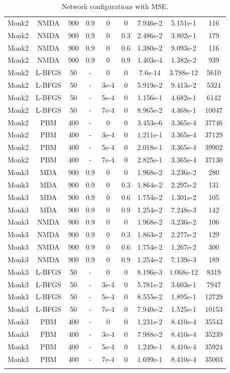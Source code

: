 \begin{center}
\begin{longtable}{|c|c|c|c|c|c|c|c|c|}
			Monk2 & NMDA & 900 & 0.9 & 0  & 0 & 7.946e-2 & 5.151e-1 & 116\\
			Monk2 & NMDA & 900 & 0.9 & 0  & 0.3 & 2.486e-2 & 3.802e-1 & 179\\
			Monk2 & NMDA & 900 & 0.9 & 0  & 0.6 & 1.380e-2 & 9.093e-2 & 116\\
			Monk2 & NMDA & 900 & 0.9 & 0  & 0.9 & 1.403e-4 & 1.382e-2 & 939\\
			Monk2 & L-BFGS & 50 & - & 0  & 0 & 7.6e-14 & 3.788e-12 & 5610\\
			Monk2 & L-BFGS & 50 & - & 3e-4  & 0  & 5.919e-2 & 9.413e-2 & 5324\\
			Monk2 & L-BFGS & 50 & - & 5e-4  & 0  & 1.156e-1& 4.682e-1 & 6142\\
			Monk2 & L-BFGS & 50 & - & 7e-4  & 0  & 8.965e-2 &  4.468e-1 & 10047\\
			Monk2 & PBM & 400 & - & 0  & 0 & 3.453e-6 & 3.365e-4 & 37746\\
			Monk2 & PBM & 400 & - & 3e-4  & 0 & 1.211e-1 & 3.365e-4 & 37129\\
			Monk2 & PBM & 400 & - & 5e-4  & 0 & 2.018e-1 & 3.365e-4 & 39902\\
			Monk2 & PBM & 400 & - & 7e-4  & 0 & 2.825e-1 & 3.365e-4 & 37130\\
			Monk3 & MDA & 900 & 0.9 & 0  & 0 & 1.968e-2 & 3.236e-2 & 280\\
			Monk3 & MDA & 900 & 0.9 & 0  & 0.3 & 1.864e-2 & 2.297e-2 & 131\\
			Monk3 & MDA & 900 & 0.9 & 0  & 0.6 & 1.754e-2 & 1.301e-2 & 105\\
			Monk3 & MDA & 900 & 0.9 & 0  & 0.9 & 1.254e-2 & 7.248e-3 & 142\\
			Monk3 & NMDA & 900 & 0.9 & 0  & 0 & 1.968e-2 & 3.236e-2 & 106\\
			Monk3 & NMDA & 900 & 0.9 & 0  & 0.3 & 1.863e-2 & 2.277e-2 & 129\\
			Monk3 & NMDA & 900 & 0.9 & 0  & 0.6 & 1.754e-2 & 1.267e-2 & 300\\
			Monk3 & NMDA & 900 & 0.9 & 0  & 0.9 & 1.254e-2 & 7.139e-3 & 189\\
			Monk3 & L-BFGS & 50 & - & 0  & 0 & 8.196e-3 & 1.068e-12 & 8319\\
			Monk3 & L-BFGS & 50 & - & 3e-4  & 0  & 5.781e-2 & 3.603e-1 & 7947\\
			Monk3 & L-BFGS & 50 & - & 5e-4  & 0  & 8.555e-2 & 1.895e-1 & 12729\\
			Monk3 & L-BFGS & 50 & - & 7e-4  & 0  & 7.940e-2 & 1.525e-1 & 10153\\
			Monk3 & PBM & 400 & - & 0  & 0 & 1.231e-2 & 8.410e-4 & 35543\\
			Monk3 & PBM & 400 & - & 3e-4  & 0 & 7.988e-2 & 8.410e-4 & 35239\\
			Monk3 & PBM & 400 & - & 5e-4  & 0 & 1.249e-1 & 8.410e-4 & 35924\\
			Monk3 & PBM & 400 & - & 7e-4  & 0 & 1.699e-1 & 8.410e-4 & 35003\\
			\hline
			\caption{Network configurations with MSE.}
			\label{tab:best_nets}
		\end{longtable}

\end{center}

